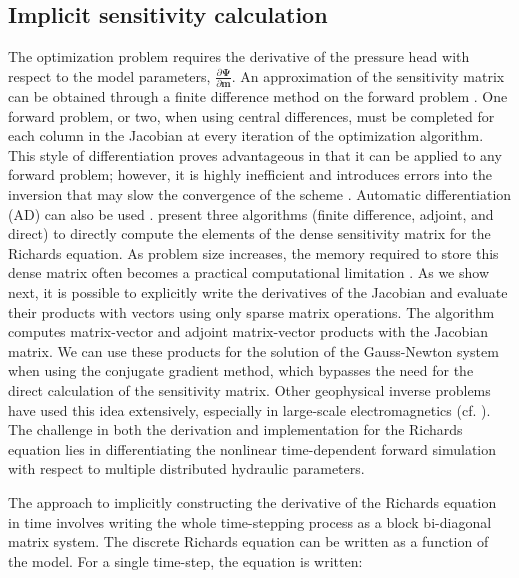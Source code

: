 \documentclass[preprint,review,3p,times,onecolumn,authoryear]{elsarticle}
\newcommand{\bfm}{\mathbf{m}}
\newcommand{\bfPsi}{\boldsymbol{\Psi}}
\begin{document}
\subsection{Implicit sensitivity calculation}
\label{sec:richards-derivs}

The optimization problem requires the derivative of the pressure head with respect to the model parameters, $\frac{\partial\bfPsi}{\partial\bfm}$. An approximation of the sensitivity matrix can be obtained through a finite difference method on the forward problem \citep{Simunek1996, Finsterle2011, Finsterle2011c}. One forward problem, or two, when using central differences, must be completed for each column in the Jacobian at every iteration of the optimization algorithm. This style of differentiation proves advantageous in that it can be applied to any forward problem; however, it is highly inefficient and introduces errors into the inversion that may slow the convergence of the scheme \citep{Doherty2015}. Automatic differentiation (AD) can also be used \citep{nw}. \cite{Bitterlich2002} present three algorithms (finite difference, adjoint, and direct) to directly compute the elements of the dense sensitivity matrix for the Richards equation. As problem size increases, the memory required to store this dense matrix often becomes a practical computational limitation \citep{hao2, Towara2015}. As we show next, it is possible to explicitly write the derivatives of the Jacobian and evaluate their products with vectors using only sparse matrix operations. The algorithm computes matrix-vector and adjoint matrix-vector products with the Jacobian matrix. We can use these products for the solution of the Gauss-Newton system when using the conjugate gradient method, which bypasses the need for the direct calculation of the sensitivity matrix. Other geophysical inverse problems have used this idea extensively, especially in large-scale electromagnetics (cf. \cite{hao}). The challenge in both the derivation and implementation for the Richards equation lies in differentiating the nonlinear time-dependent forward simulation with respect to multiple distributed hydraulic parameters.

The approach to implicitly constructing the derivative of the Richards equation in time involves writing the whole time-stepping process as a block bi-diagonal matrix system. The discrete Richards equation can be written as a function of the model. For a single time-step, the equation is written:
\end{document}
